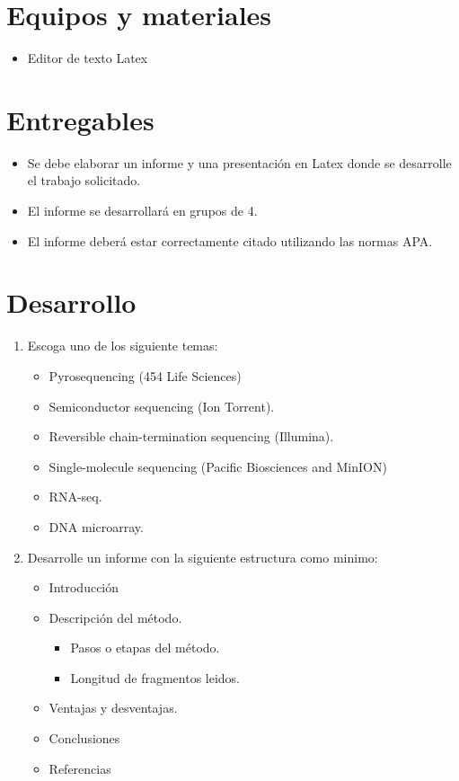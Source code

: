 \documentclass{article}
\begin{document}
	\section{Equipos y materiales}
	\begin{itemize}
		\item Editor de texto  Latex 
	\end{itemize}
	
	\section{Entregables}
	\begin{itemize}
		\item Se debe elaborar un informe y una presentación en Latex donde se desarrolle el trabajo solicitado.
		\item El informe se desarrollará en grupos de 4.
		\item El informe deberá estar correctamente citado utilizando las normas APA.
	\end{itemize}
		
	
	
	\clearpage
	
	
	\section{Desarrollo}\label{sec:ejercicios}
	\begin{enumerate}
		\item Escoga uno de los siguiente temas:
			\begin{itemize}
				\item Pyrosequencing (454 Life Sciences)
				\item Semiconductor sequencing (Ion Torrent).			
				\item Reversible chain-termination sequencing (Illumina).			
				\item Single-molecule sequencing (Pacific Biosciences and MinION)	
				\item RNA-seq.
				\item DNA microarray.
			\end{itemize}
		\item Desarrolle un informe con la siguiente estructura como minimo:
			\begin{itemize}
				\item Introducción
				\item Descripción del método.
					\begin{itemize}
						\item Pasos o etapas del método.
						\item Longitud de fragmentos leidos.
					\end{itemize}
				\item Ventajas y desventajas.			
				\item Conclusiones
				\item Referencias
			\end{itemize}
			
	\end{enumerate}
	
	
	
\end{document}
